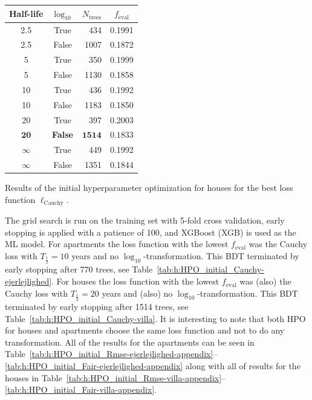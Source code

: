 \begin{margintable}
  \begin{tabular}{@{}ccrc@{}}
    Half-life & $\log_{10}$ & $N_\mathrm{trees}$ & $f_\mathrm{eval}$ \\
    \midrule
    \num{2.5} & True & \num{434} & \num{0.1991} \\
    \num{2.5} & False & \num{1007} & \num{0.1872} \\
    \num{5} & True & \num{350} & \num{0.1999} \\
    \num{5} & False & \num{1130} & \num{0.1858} \\
    \num{10} & True & \num{436} & \num{0.1992} \\
    \num{10} & False & \num{1183} & \num{0.1850} \\
    \num{20} & True & \num{397} & \num{0.2003} \\
    $\mathbf{20}$ & \textbf{False} & $\mathbf{1514}$ & $\mathbf{0.1833}$ \\
    $\infty$ & True & \num{449} & \num{0.1992} \\
    $\infty$ & False & \num{1351} & \num{0.1844} \\
  \end{tabular}
  \caption{\label{tab:h:HPO_initial_Cauchy-villa}Results of the initial hyperparameter optimization for houses for the best loss function $\ell_\mathrm{Cauchy}$.}
\end{margintable}


The grid search is run on the training set with \num{5}-fold cross validation, early stopping is applied with a patience of \num{100}, and XGBoost \autocite{chenXGBoostScalableTree2016} (XGB) is used as the ML model. For apartments the loss function with the lowest $f_\mathrm{eval}$ was the Cauchy loss with $T_{\frac{1}{2}}=10$ years and no $\log_{10}$-transformation. This BDT terminated by early stopping after \num{770} trees, see Table~\ref{tab:h:HPO_initial_Cauchy-ejerlejlighed}. 
For houses the loss function with the lowest $f_\mathrm{eval}$ was (also) the Cauchy loss with $T_{\frac{1}{2}}=20$ years and (also) no $\log_{10}$-transformation. This BDT terminated by early stopping after \num{1514} trees, see Table~\ref{tab:h:HPO_initial_Cauchy-villa}. 
It is interesting to note that both HPO for houses and apartments choose the same loss function and not to do any transformation. All of the results for the apartments can be seen in Table~\ref{tab:h:HPO_initial_Rmse-ejerlejlighed-appendix}--\ref{tab:h:HPO_initial_Fair-ejerlejlighed-appendix} along with all of results for the houses in Table~\ref{tab:h:HPO_initial_Rmse-villa-appendix}--\ref{tab:h:HPO_initial_Fair-villa-appendix}. 

